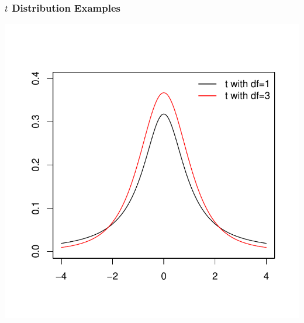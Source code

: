 \documentclass[handout]{beamer}
\begin{document}
\addtocounter{framenumber}{-1}
\begin{frame}
\frametitle{$t$ Distribution Examples}
\begin{center}
\includegraphics{figure/lec16-002}
\end{center}
\end{frame}
\end{document}

